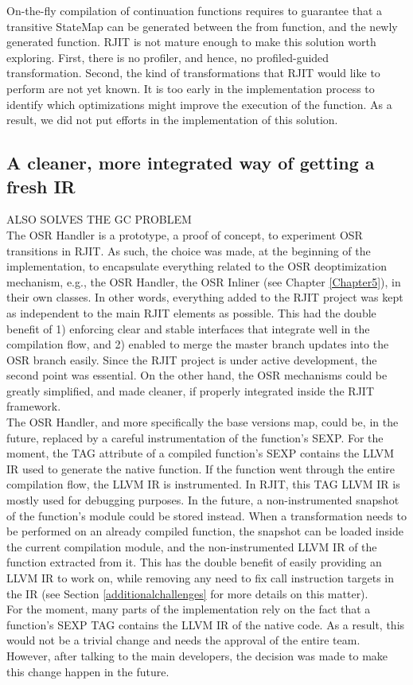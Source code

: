 On-the-fly compilation of continuation functions requires to guarantee that a transitive StateMap can be generated between the from function, and the newly generated function.
RJIT is not mature enough to make this solution worth exploring.
First, there is no profiler, and hence, no profiled-guided transformation. 
Second, the kind of transformations that RJIT would like to perform are not yet known. 
It is too early in the implementation process to identify which optimizations might improve the execution of the function.
As a result, we did not put efforts in the implementation of this solution.\\

\subsection{A cleaner, more integrated way of getting a fresh IR}\label{section:cleanerIR}
ALSO SOLVES THE GC PROBLEM\\

The OSR Handler is a prototype, a proof of concept, to experiment OSR transitions in RJIT. 
As such, the choice was made, at the beginning of the implementation, to encapsulate everything related to the OSR deoptimization mechanism, e.g., the OSR Handler, the OSR Inliner (see Chapter \ref{Chapter5}), in their own classes.
In other words, everything added to the RJIT project was kept as independent to the main RJIT elements as possible.
This had the double benefit of 1) enforcing clear and stable interfaces that integrate well in the compilation flow, and 2) enabled to merge the master branch updates into the OSR branch easily.
Since the RJIT project is under active development, the second point was essential.
On the other hand, the OSR mechanisms could be greatly simplified, and made cleaner, if properly integrated inside the RJIT framework.\\

The OSR Handler, and more specifically the base versions map, could be, in the future, replaced by a careful instrumentation of the function's SEXP. 
For the moment, the TAG attribute of a compiled function's SEXP contains the LLVM IR used to generate the native function.
If the function went through the entire compilation flow, the LLVM IR is instrumented. 
In RJIT, this TAG LLVM IR is mostly used for debugging purposes.
In the future, a non-instrumented snapshot of the function's module could be stored instead.
When a transformation needs to be performed on an already compiled function, the snapshot can be loaded inside the current compilation module, and the non-instrumented LLVM IR of the function extracted from it.
This has the double benefit of easily providing an LLVM IR to work on, while removing any need to fix call instruction targets in the IR (see Section \ref{additionalchallenges} for more details on this matter).\\

For the moment, many parts of the implementation rely on the fact that a function's SEXP TAG contains the LLVM IR of the native code. 
As a result, this would not be a trivial change and needs the approval of the entire team.
However, after talking to the main developers, the decision was made to make this change happen in the future.\\